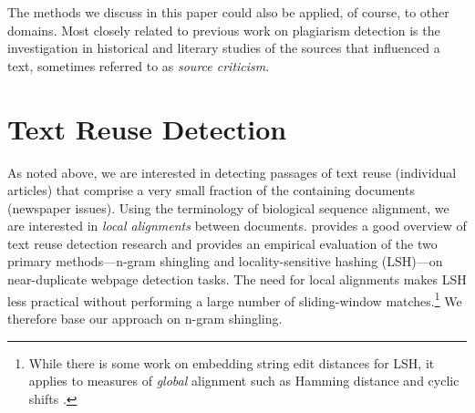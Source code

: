 \documentclass[pdftex,11pt]{article}
\begin{document}
The methods we discuss in this paper could also be applied, of course,
to other domains.  Most closely related to previous work on plagiarism
detection is the investigation in historical and literary studies of
the sources that influenced a text, sometimes referred to as
\emph{source criticism}.

\section{Text Reuse Detection}
\label{sec:detection}

As noted above, we are interested in detecting passages of text reuse
(individual articles) that comprise a very small fraction of the
containing documents (newspaper issues).  Using the terminology of
biological sequence alignment, we are interested in \emph{local
  alignments} between documents.
\citet{henzinger06:_findin_near_duplic_web_pages} provides a good
overview of text reuse detection research and provides an empirical
evaluation of the two primary methods---n-gram shingling and
locality-sensitive hashing (LSH)---on near-duplicate webpage detection
tasks.  The need for local alignments makes LSH less practical without
performing a large number of sliding-window matches.\footnote{While
  there is some work on embedding string edit distances for LSH, it
  applies to measures of \emph{global} alignment such as Hamming
  distance and cyclic shifts \citep{andoni13:_homom_finger_misal}.} We
therefore base our approach on n-gram shingling.
\end{document}
